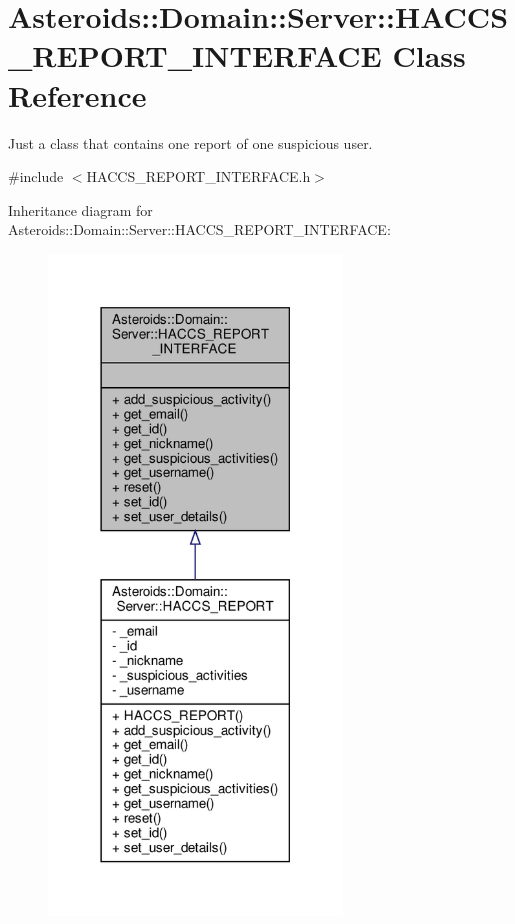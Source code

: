 \hypertarget{classAsteroids_1_1Domain_1_1Server_1_1HACCS__REPORT__INTERFACE}{}\section{Asteroids\+:\+:Domain\+:\+:Server\+:\+:H\+A\+C\+C\+S\+\_\+\+R\+E\+P\+O\+R\+T\+\_\+\+I\+N\+T\+E\+R\+F\+A\+CE Class Reference}
\label{classAsteroids_1_1Domain_1_1Server_1_1HACCS__REPORT__INTERFACE}


Just a class that contains one report of one suspicious user.  




{\ttfamily \#include $<$H\+A\+C\+C\+S\+\_\+\+R\+E\+P\+O\+R\+T\+\_\+\+I\+N\+T\+E\+R\+F\+A\+C\+E.\+h$>$}



Inheritance diagram for Asteroids\+:\+:Domain\+:\+:Server\+:\+:H\+A\+C\+C\+S\+\_\+\+R\+E\+P\+O\+R\+T\+\_\+\+I\+N\+T\+E\+R\+F\+A\+CE\+:\nopagebreak
\begin{figure}[H]
\begin{center}
\leavevmode
\includegraphics[width=221pt]{classAsteroids_1_1Domain_1_1Server_1_1HACCS__REPORT__INTERFACE__inherit__graph}
\end{center}
\end{figure}


